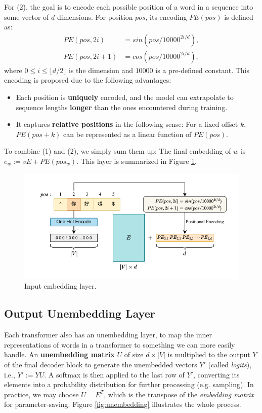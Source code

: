 For (2), the goal is to encode each possible position of a word in a sequence into some vector of $d$ dimensions. For position $pos$, its encoding $PE(pos)$ is defined as:
\begin{align*}
    PE(pos, 2i) &= sin(pos/10000^{2i/d}), \\
    PE(pos, 2i+1) &= cos(pos/10000^{2i/d}),
\end{align*}
where $0 \le i \le \lfloor d/2 \rfloor$ is the dimension and $10000$ is a pre-defined constant. This encoding is proposed due to the following advantages:

\begin{itemize}
    \item Each position is \textbf{uniquely} encoded, and the model can extrapolate to sequence lengths \textbf{longer} than the ones encountered during training.
    \item It captures \textbf{relative positions} in the following sense: For a fixed offset $k$, $PE(pos + k)$  can be represented as a linear function of $PE(pos)$.
\end{itemize}

To combine (1) and (2), we simply sum them up: The final embedding of $w$ is $e_w := vE + PE(pos_w)$. This layer is summarized in Figure \ref{fig:embedding}.

\begin{figure}
    \centering
    \includegraphics[width=0.9\linewidth]{fig/embedding.pdf}
    \caption{Input embedding layer.}
    \label{fig:embedding}
\end{figure}

\subsection{Output Unembedding Layer}

Each transformer also has an unembedding layer, to map the inner representations of words in a transformer to something we can more easily handle. An \textbf{unembedding matrix} $U$ of size $d \times |V|$ is multiplied to the output $Y$ of the final decoder block to generate the unembedded vectors $Y'$ (called \textit{logits}), i.e., $Y' := YU$. A softmax is then applied to the last row of $Y'$, converting its elements into a probability distribution for further processing (e.g. sampling). In practice, we may choose $U = E^T$, which is the transpose of the \textit{embedding matrix} for parameter-saving. Figure \ref{fig:unembedding} illustrates the whole process.


